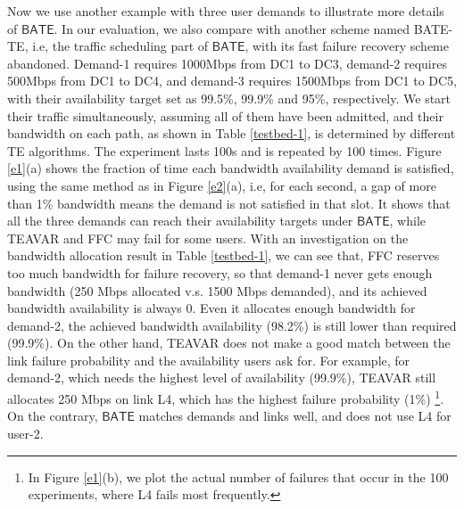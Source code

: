 \documentclass[sigconf]{acmart}
\begin{document}
Now we use another example with three user demands to illustrate more details of $\mathsf{BATE}$. 
In our evaluation, we also compare with another scheme named BATE-TE, i.e, the traffic scheduling part of $\mathsf{BATE}$, with its fast failure recovery scheme abandoned. 
Demand-1 requires 1000Mbps from DC1 to DC3, demand-2 requires  500Mbps from DC1 to DC4, 
and demand-3 requires 1500Mbps from DC1 to DC5, 
with their availability target set as 99.5\%, 99.9\% and 95\%, respectively. 
We start their traffic simultaneously, assuming all of them have been admitted, 
and their bandwidth on each path, as shown in Table \ref{testbed-1}, 
is determined by different TE algorithms. 
The experiment lasts 100s and is repeated by 100 times.
Figure \ref{e1}(a) shows the fraction of time each bandwidth availability demand is satisfied, 
using the same method as in Figure \ref{e2}(a), i.e, for each second, 
a gap of more than 1\% bandwidth means the demand is not satisfied in that slot. 
It shows that all the three demands can reach their availability targets under $\mathsf{BATE}$,
while TEAVAR and FFC may fail for some users. 
With an investigation on the bandwidth allocation result in Table \ref{testbed-1}, 
we can see that, FFC reserves too much bandwidth for failure recovery, 
so that demand-1 never gets enough bandwidth (250 Mbps allocated v.s. 1500 Mbps demanded), 
and its achieved bandwidth availability is always 0. 
Even it allocates enough bandwidth for demand-2, the achieved bandwidth availability (98.2\%)  
is still lower than required (99.9\%). 
On the other hand, TEAVAR does not make a good match between the link failure probability and the availability users ask for. 
For example, for demand-2, which needs the highest level of availability (99.9\%), 
TEAVAR still allocates 250 Mbps on link L4, which has the highest failure probability (1\%) 
\footnote{In Figure \ref{e1}(b), we plot the actual number of failures that occur in the 100 experiments, 
where L4 fails most frequently.}. 
On the contrary, $\mathsf{BATE}$ matches demands and links well, and does not use L4 for user-2.
\end{document}
